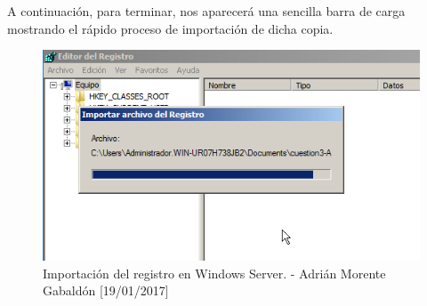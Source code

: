 	A continuación, para terminar, nos aparecerá una sencilla barra de carga mostrando el rápido proceso de importación de dicha copia.
	\begin{figure}[H]
		\centering
		\includegraphics[scale=0.7]{regedit-importar2}
		\caption{Importación del registro en Windows Server. - Adrián Morente Gabaldón [19/01/2017]}
		\label{figura10}
	\end{figure}

